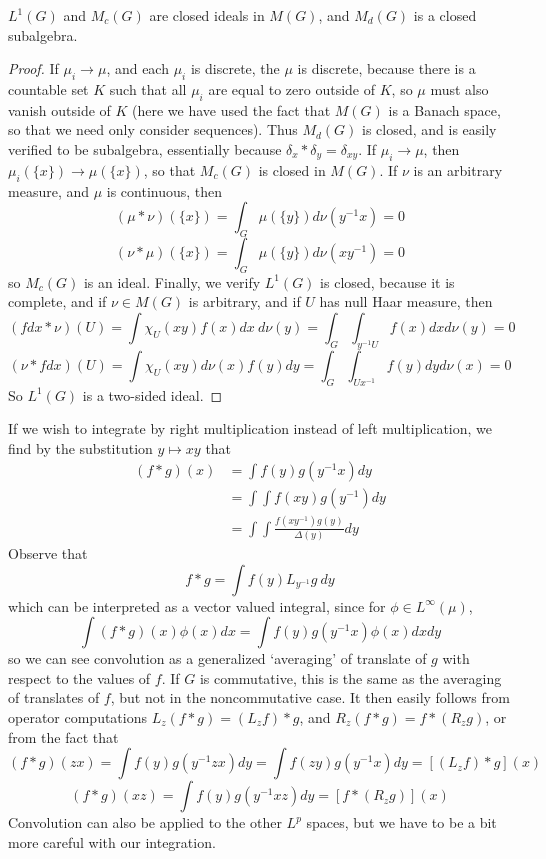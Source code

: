 \begin{theorem}
    $L^1(G)$ and $M_c(G)$ are closed ideals in $M(G)$, and $M_d(G)$ is a closed subalgebra.
\end{theorem}
\begin{proof}
    If $\mu_i \to \mu$, and each $\mu_i$ is discrete, the $\mu$ is discrete, because there is a countable set $K$ such that all $\mu_i$ are equal to zero outside of $K$, so $\mu$ must also vanish outside of $K$ (here we have used the fact that $M(G)$ is a Banach space, so that we need only consider sequences). Thus $M_d(G)$ is closed, and is easily verified to be subalgebra, essentially because $\delta_x * \delta_y = \delta_{xy}$. If $\mu_i \to \mu$, then $\mu_i(\{x\}) \to \mu(\{x\})$, so that $M_c(G)$ is closed in $M(G)$. If $\nu$ is an arbitrary measure, and $\mu$ is continuous, then
    \[ (\mu * \nu)(\{ x \}) = \int_G \mu(\{ y \}) d\nu(y^{-1}x) = 0 \]
    \[ (\nu * \mu)(\{ x \}) = \int_G \mu(\{ y \}) d\nu(xy^{-1}) = 0 \]
    so $M_c(G)$ is an ideal. Finally, we verify $L^1(G)$ is closed, because it is complete, and if $\nu \in M(G)$ is arbitrary, and if $U$ has null Haar measure, then
    \[ (f dx * \nu)(U) = \int \chi_{U}(xy) f(x) dx\ d\nu(y) = \int_G \int_{y^{-1}U} f(x) dx d\nu(y) = 0 \]
    \[ (\nu * f dx)(U) = \int \chi_U(xy) d\nu(x) f(y) dy = \int_G \int_{Ux^{-1}} f(y) dy d\nu(x) = 0 \]
    So $L^1(G)$ is a two-sided ideal.
\end{proof}

If we wish to integrate by right multiplication instead of left multiplication, we find by the substitution $y \mapsto xy$ that
%
\begin{align*}
    (f*g)(x) &= \int f(y) g(y^{-1}x) dy\\
    &= \int \int f(xy) g(y^{-1}) dy\\
    &= \int \int \frac{f(xy^{-1}) g(y)}{\Delta(y)} dy
\end{align*}
%
Observe that
%
\[ f*g = \int f(y) L_{y^{-1}} g\ dy \]
%
which can be interpreted as a vector valued integral, since for $\phi \in L^\infty(\mu)$,
%
\[ \int (f*g)(x) \phi(x) dx = \int f(y) g(y^{-1}x) \phi(x) dx dy \]
%
so we can see convolution as a generalized `averaging' of translate of $g$ with respect to the values of $f$. If $G$ is commutative, this is the same as the averaging of translates of $f$, but not in the noncommutative case. It then easily follows from operator computations $L_z (f*g) = (L_z f) * g$, and $R_z (f*g) = f * (R_zg)$, or from the fact that
%
\[ (f*g)(zx) = \int f(y) g(y^{-1}zx) dy = \int f(zy) g(y^{-1}x) dy = [(L_z f) * g](x) \]
\[ (f*g)(xz) = \int f(y) g(y^{-1}xz) dy = [f * (R_z g)](x) \]
%
Convolution can also be applied to the other $L^p$ spaces, but we have to be a bit more careful with our integration.

